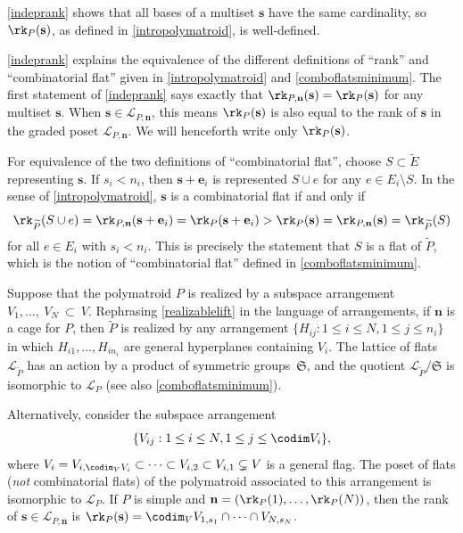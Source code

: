 \begin{rema}\label{welldfndrk}
  \cref{indeprank} shows that all bases of a multiset $\mathbf s$ have the same cardinality, so $\rk_P(\mathbf s)$, as defined in \cref{intropolymatroid}, is well-defined.
\end{rema}
\begin{rema}\label{equivalence}
  \cref{indeprank} explains the equivalence of the different definitions of ``rank'' and ``combinatorial flat'' given in \cref{intropolymatroid} and \cref{comboflatsminimum}.
  The first statement of \cref{indeprank} says exactly that $\rk_{P, \mathbf n}(\mathbf s) = \rk_P(\mathbf s)$ for any multiset $\mathbf s$. When $\mathbf s \in \mathcal L_{P, \mathbf n}$, this means $\rk_P(\mathbf s)$ is also equal to the rank of $\mathbf s$ in the graded poset $\mathcal L_{P, \mathbf n}$.
  We will henceforth write only $\rk_P(\mathbf s)$.

  For equivalence of the two definitions of ``combinatorial flat'', choose $S \subset \widetilde E$ representing $\mathbf s$.
  If $s_i < n_i$, then $\mathbf s + \mathbf e_i$ is represented $S \cup e$ for any $e \in E_i \setminus S$.
  In the sense of \cref{intropolymatroid}, $\mathbf s$ is a combinatorial flat if and only if
  \[
    \rk_{\widetilde P}(S \cup e) = \rk_{P, \mathbf n}(\mathbf s + \mathbf e_i) = \rk_P(\mathbf s + \mathbf e_i)  > \rk_P(\mathbf s) = \rk_{P, \mathbf n}(\mathbf s) = \rk_{\widetilde P}(S)
  \]
  for all $e \in E_i$ with $s_i < n_i$.
  This is precisely the statement that $S$ is a flat of $\widetilde P$, which is the notion of ``combinatorial flat'' defined in \cref{comboflatsminimum}.
\end{rema}
\begin{rema}\label{geometryofcf}
  Suppose that the polymatroid $P$ is realized by a subspace arrangement $V_1, \ldots,~V_N~\subset~V$.
  Rephrasing \cref{realizablelift} in the language of arrangements, if $\mathbf n$ is a cage for $P$, then $\widetilde P$ is realized by any arrangement $\{H_{ij} : 1 \leq i \leq N, 1 \leq j \leq n_i\}$ in which $H_{i1},\ldots, H_{in_i}$ are general hyperplanes containing $V_i$.
  The lattice of flats $\mathcal L_{\widetilde P}$ has an action by a product of symmetric groups~$\mathfrak S$, and the quotient $\mathcal L_{\widetilde P} / \mathfrak S$ is isomorphic to $\mathcal L_P$ (see also \cref{comboflatsminimum}).

  Alternatively, consider the subspace arrangement 
  \[
  \{V_{ij} : 1 \leq i \leq N, 1 \leq j \leq \codim V_i\},
  \]
  where $V_i = V_{i,\codim_V V_i} \subset \cdots \subset V_{i,2} \subset V_{i,1} \subsetneq V$ is a general flag.
  The poset of flats (\emph{not} combinatorial flats) of the polymatroid associated to this arrangement is isomorphic to $\mathcal L_P$. If $P$ is simple and $\mathbf n = (\rk_P(1), \ldots, \rk_P(N))$, then the rank of $\mathbf s \in \mathcal L_{P, \mathbf n}$ is $\rk_P(\mathbf s) = \codim_V V_{1,s_1} \cap \cdots \cap V_{N, s_N}$.
\end{rema}
